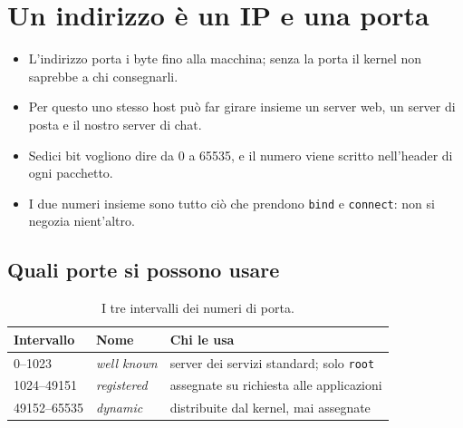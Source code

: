 \section{Un indirizzo è un IP e una porta}


\begin{itemize}
    \item L'indirizzo porta i byte fino alla macchina; senza la porta il kernel non saprebbe a chi consegnarli.
    \item Per questo uno stesso host può far girare insieme un server web, un server di posta e il nostro server di chat.
    \item Sedici bit vogliono dire da 0 a 65535, e il numero viene scritto nell'header di ogni pacchetto.
    \item I due numeri insieme sono tutto ciò che prendono \texttt{bind} e \texttt{connect}: non si negozia nient'altro.
\end{itemize}

\subsection{Quali porte si possono usare}

\begin{table}[H]
\centering
\begin{tabular}{l l l}
\toprule
\textbf{Intervallo} & \textbf{Nome} & \textbf{Chi le usa} \\
\midrule
0--1023       & \emph{well known}  & server dei servizi standard; solo \texttt{root} \\
1024--49151   & \emph{registered}  & assegnate su richiesta alle applicazioni \\
49152--65535  & \emph{dynamic}     & distribuite dal kernel, mai assegnate \\
\bottomrule
\end{tabular}
\caption{I tre intervalli dei numeri di porta.}
\end{table}

